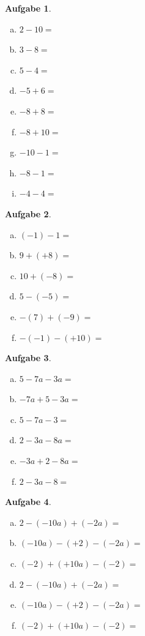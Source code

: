 \documentclass[12pt,fleqn]{article}
\theoremstyle{aufg}
\newtheorem{aufgabe}{Aufgabe}
\theoremstyle{bsp}
\begin{document}
 
    \begin{flushleft}
\begin{aufgabe} ~ \\ 
\begin{multicols}{3} 
\begin{enumerate}[a)] 
\item 
$2-10=$
\item 
$3-8=$
\item 
$5-4=$
\item 
$-5+6=$
\item 
$-8+8=$
\item 
$-8+10=$
\item 
$-10-1=$
\item 
$-8-1=$
\item 
$-4-4=$
\end{enumerate} 
\end{multicols} 
\end{aufgabe} 
\begin{aufgabe} ~ \\ 
\begin{multicols}{3} 
\begin{enumerate}[a)] 
\item 
$(-1)-1=$
\item 
$9+(+8)=$
\item 
$10+(-8)=$
\item 
$5-(-5)=$
\item 
$-(7)+(-9)=$
\item 
$-(-1)-(+10)=$
\end{enumerate} 
\end{multicols} 
\end{aufgabe} 
\begin{aufgabe} ~ \\ 
\begin{multicols}{3} 
\begin{enumerate}[a)] 
\item 
$5-7a-3a=$
\item 
$-7a+5-3a=$
\item 
$5-7a-3=$
\item 
$2-3a-8a=$
\item 
$-3a+2-8a=$
\item 
$2-3a-8=$
\end{enumerate} 
\end{multicols} 
\end{aufgabe} 
\begin{aufgabe} ~ \\ 
\begin{multicols}{3} 
\begin{enumerate}[a)] 
\item 
$2-(-10a)+(-2a)=$
\item 
$(-10a)-(+2)-(-2a)=$
\item 
$(-2)+(+10a)-(-2)=$
\item 
$2-(-10a)+(-2a)=$
\item 
$(-10a)-(+2)-(-2a)=$
\item 
$(-2)+(+10a)-(-2)=$
\end{enumerate} 
\end{multicols} 
\end{aufgabe} 


\end{flushleft}
\end{document}

